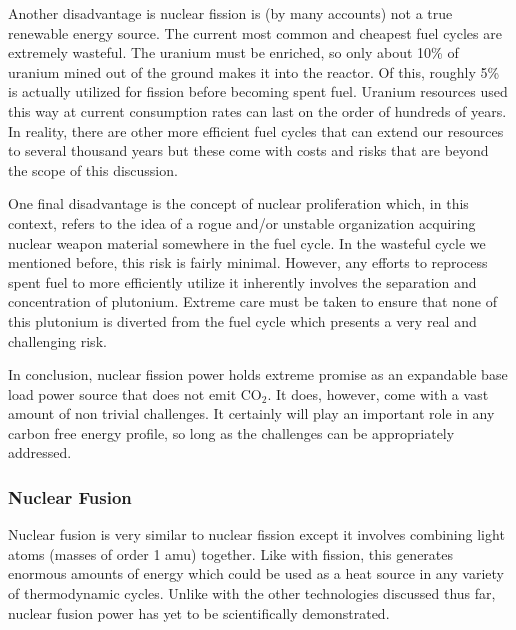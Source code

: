 		Another disadvantage is nuclear fission is (by many accounts) not a true renewable energy source. \cite{bibid} The current most common and cheapest fuel cycles are extremely wasteful. The uranium must be enriched, so only about 10\% of uranium mined out of the ground makes it into the reactor. Of this, roughly 5\% is actually utilized for fission before becoming spent fuel. \cite{https://www.world-nuclear.org/information-library/nuclear-fuel-cycle/introduction/nuclear-fuel-cycle-overview.aspx} Uranium resources used this way at current consumption rates can last on the order of hundreds of years. \cite{bibid} In reality, there are other more efficient fuel cycles that can extend our resources to several thousand years but these come with costs and risks that are beyond the scope of this discussion. \cite{bibid}
		
		One final disadvantage is the concept of nuclear proliferation which, in this context, refers to the idea of a rogue and/or unstable organization acquiring nuclear weapon material somewhere in the fuel cycle. \cite{bibid} In the wasteful cycle we mentioned before, this risk is fairly minimal. However, any efforts to reprocess spent fuel to more efficiently utilize it inherently involves the separation and concentration of plutonium. \cite{bibid} Extreme care must be taken to ensure that none of this plutonium is diverted from the fuel cycle which presents a very real and challenging risk.
		
		In conclusion, nuclear fission power holds extreme promise as an expandable base load power source that does not emit CO$_2$. It does, however, come with a vast amount of non trivial challenges. It certainly will play an important role in any carbon free energy profile, so long as the challenges can be appropriately addressed.
		
		
	\subsubsection{Nuclear Fusion}
	
		Nuclear fusion is very similar to nuclear fission except it involves combining light atoms (masses of order 1 amu) together. \cite{bibid} Like with fission, this generates enormous amounts of energy which could be used as a heat source in any variety of thermodynamic cycles. Unlike with the other technologies discussed thus far, nuclear fusion power has yet to be scientifically demonstrated. \cite{bibid}
		
		\begin{figure}[h!]
			\centering
			\caption{}
		\end{figure}
		
